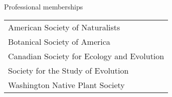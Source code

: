 \documentclass[letterpaper,11pt,oneside]{article}
\begin{document}
\bgroup
\noindent\Large{Professional memberships}  
\normalsize
\bigskip

\def\arraystretch{1.1}
\noindent \begin{tabular}{@{} p{13.11cm}}
 American Society of Naturalists \\
 Botanical Society of America \\
 Canadian Society for Ecology and Evolution \\
 Society for the Study of Evolution \\
 Washington Native Plant Society \\
\end{tabular}
\egroup
\bigskip
\bigskip


% 
% 
\end{document}

